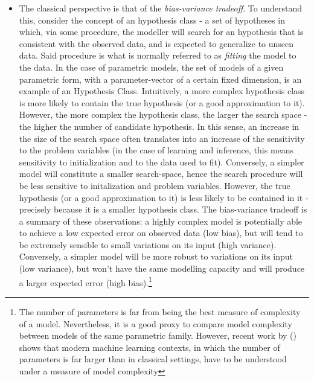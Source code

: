 \begin{itemize}
    \item The classical perspective is that of the \emph{bias-variance tradeoff}. To
        understand this, consider the concept of an hypothesis class - a set
        of hypotheses in which, via some procedure, the modeller will search
        for an hypothesis that is consistent with the observed data, and is
        expected to generalize to unseen data. Said procedure is what is normally
        referred to as \emph{fitting} the model to the data. In the case of
        parametric models, the set of models of a given parametric form, with
        a parameter-vector of a certain fixed dimension, is an example of an Hypothesis
        Class. Intuitively, a more complex hypothesis class is more likely to
        contain the true hypothesis (or a good approximation to it). However,
        the more complex the hypothesis class, the larger the search space -
        the higher the number of candidate hypothesis. In this sense, an increase
        in the size of the search space often translates into an increase of the
        sensitivity to the problem variables (in the case of learning and inference,
        this means sensitivity to initialization and to the data used to fit).
        Conversely, a simpler model will constitute a smaller search-space, hence
        the search procedure will be less sensitive to initalization and problem
        variables. However, the true hypothesis (or a good approximation to it)
        is less likely to be contained in it - precisely because it is a smaller
        hypothesis class. The bias-variance tradeoff is a summary of these observations:
        a highly complex model is potentially able to achieve a low expected error
        on observed data (low bias), but will tend to be extremely sensible to small
        variations on its input (high variance). Conversely, a simpler model will
        be more robust to variations on its input (low variance), but won't have the same
        modelling capacity and will produce a larger expected error (high bias).\footnote{
        The number of parameters is far from being the best measure of complexity
        of a model. Nevertheless, it is a good proxy to compare model complexity
        between models of the same parametric family. However, recent work by
        \citeauthor{Belkin2018Dec} (\cite{Belkin2018Dec}) shows that modern machine learning
        contexts, in which the number of parameters is far larger than in classical
        settings, have to be understood under a measure of model complexity
}
\end{itemize}
